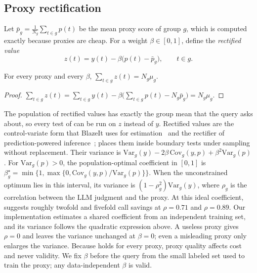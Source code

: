 \subsection{Proxy rectification}
\label{sec:rectify}

Let $\bar p_g=\frac1{N_g}\sum_{t\in g}p(t)$ be the mean proxy score of group $g$, which is computed exactly because proxies are cheap.
For a weight $\beta\in[0,1]$, define the \emph{rectified value}
\begin{equation}
z(t)=y(t)-\beta\bigl(p(t)-\bar p_g\bigr),\qquad t\in g .
\label{eq:rectify}
\end{equation}

\begin{lemma}
\label{lem:unbiased}
For every proxy and every $\beta$, $\sum_{t\in g}z(t)=N_g\mu_g$.
\end{lemma}
\begin{proof}
$\sum_{t\in g}z(t)=\sum_{t\in g}y(t)-\beta\bigl(\sum_{t\in g}p(t)-N_g\bar p_g\bigr)=N_g\mu_g$.
\end{proof}

The population of rectified values has exactly the group mean that the query asks about, so every test of  can be run on $z$ instead of $y$.
Rectified values are the control-variate form that BlazeIt uses for estimation~\cite{blazeit} and the rectifier of prediction-powered inference~\cite{ppi,avppi,ppevalues}; \sys{} places them inside boundary tests under sampling without replacement.
Their variance is $\mathrm{Var}_g(y)-2\beta\,\mathrm{Cov}_g(y,p)+\beta^2\mathrm{Var}_g(p)$.
For $\mathrm{Var}_g(p)>0$, the population-optimal coefficient in $[0,1]$ is $\beta_g^\star=\min\{1,\max\{0,\mathrm{Cov}_g(y,p)/\mathrm{Var}_g(p)\}\}$.
When the unconstrained optimum lies in this interval, its variance is $(1-\rho_g^2)\mathrm{Var}_g(y)$, where $\rho_g$ is the correlation between the LLM judgment and the proxy.
At this ideal coefficient,  suggests roughly twofold and fivefold call savings at $\rho=0.71$ and $\rho=0.89$. Our implementation estimates a shared coefficient from an independent training set, and its variance follows the quadratic expression above.
A useless proxy gives $\rho=0$ and leaves the variance unchanged at $\beta=0$; even a misleading proxy only enlarges the variance.
Because  holds for every proxy, proxy quality affects cost and never validity.
We fix $\beta$ before the query from the small labeled set used to train the proxy; any data-independent $\beta$ is valid.


